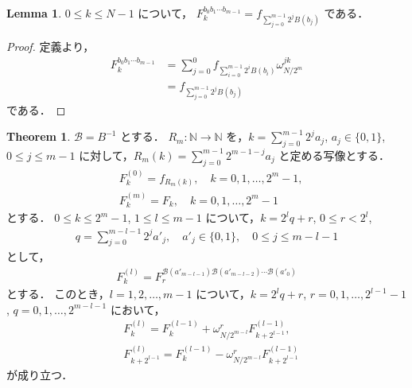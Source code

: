 \documentclass[twocolumn, uplatex, dvipdfmx]{jsarticle}
\renewcommand{\le}{\leqslant}
\numberwithin{equation}{section}
\theoremstyle{definition}
\newtheorem{thm}{Theorem}[section]
\newtheorem{lem}{Lemma}[section]
\begin{document}
\begin{lem}
	$0\le k\le N-1$ について，
	$F_k^{b_0b_1\cdots b_{m-1}}=f_{\sum_{j=0}^{m-1}2^jB(b_j)}$ である．
\end{lem}
\begin{proof}
	定義より，
	\begin{align*}
		F_k^{b_0b_1\cdots b_{m-1}}&=\sum_{j=0}^0f_{\sum_{i=0}^{m-1}2^iB(b_i)}\omega_{N/2^m}^{jk}\\
		&=f_{\sum_{j=0}^{m-1}2^jB(b_j)}
	\end{align*}
	である．
\end{proof}

\begin{thm}
	$\mathcal{B}=B^{-1}$ とする．
	$R_m:\mathbb{N}\to\mathbb{N}$ を，$k=\sum_{j=0}^{m-1}2^ja_j$, $a_j\in\{0,1\}$, $0\le j\le m-1$ に対して，$R_m(k)=\sum_{j=0}^{m-1}2^{m-1-j}a_j$ と定める写像とする．
	\begin{align}
		&F_k^{(0)}=f_{R_m(k)},\quad k=0,1,\dots,2^m-1,\\
		&F_k^{(m)}=F_k,\quad k=0,1,\dots,2^m-1
	\end{align}
	とする．
	$0\le k\le 2^m-1$, $1\le l\le m-1$ について，$k=2^lq+r$, $0\le r<2^l$,
	\begin{align}
		q=\sum_{j=0}^{m-l-1}2^ja'_j,\quad a'_j\in\{0,1\},\quad 0\le j\le m-l-1
	\end{align}
	として，
	\begin{align}
		F_k^{(l)}=F_r^{\mathcal{B}(a'_{m-l-1})\mathcal{B}(a'_{m-l-2})\cdots\mathcal{B}(a'_0)}
	\end{align}
	とする．
	このとき，$l=1,2,\dots,m-1$ について，$k=2^lq+r$, $r=0,1,\dots,2^{l-1}-1$, $q=0,1,\dots,2^{m-l-1}$ において，
	\begin{align}
		&F_k^{(l)}=F_k^{(l-1)}+\omega_{N/2^{m-l}}^rF_{k+2^{l-1}}^{(l-1)},\\
		&F_{k+2^{l-1}}^{(l)}=F_k^{(l-1)}-\omega_{N/2^{m-l}}^rF_{k+2^{l-1}}^{(l-1)}
	\end{align}
	が成り立つ．
\end{thm}
\end{document}
